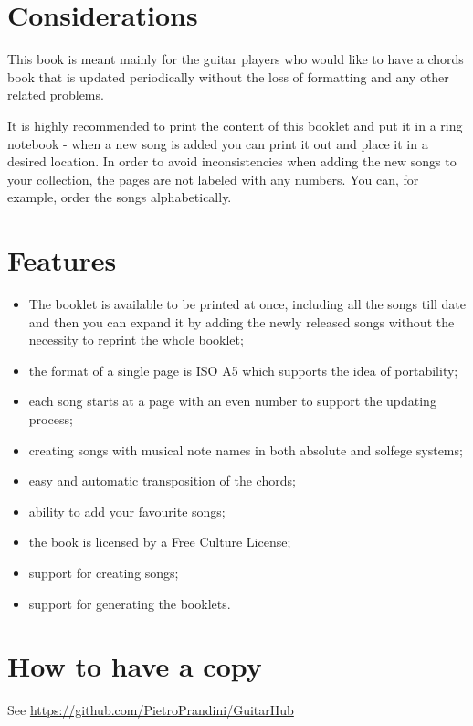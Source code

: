 % 
% 
% 
% 

\section*{Considerations}
This book is meant mainly for the guitar players who would like to have a chords book that is updated periodically without the loss of formatting and any other related problems.\par
It is highly recommended to print the content of this booklet and put it in a ring notebook - when a new song is added you can print it out and place it in a desired location. In order to avoid inconsistencies when adding the new songs to your collection, the pages are not labeled with any numbers. You can, for example, order the songs alphabetically.\par

\section*{Features}
\begin{itemize}
\item The booklet is available to be printed at once, including all the songs till date and then you can expand it by adding the newly released songs without the necessity to reprint the whole booklet;
\item the format of a single page is ISO A5 which supports the idea of  portability;
\item each song starts at a page with an even number to support the updating process;
\item creating songs with musical note names in both absolute and solfege systems;
\item easy and automatic transposition of the chords;
\item ability to add your favourite songs;
\item the book is licensed by a Free Culture License;
\item support for creating songs;
\item support for generating the booklets.
\end{itemize}

\section*{How to have a copy}
See \href{https://github.com/PietroPrandini/GuitarHub}{https://github.com/PietroPrandini/GuitarHub}

\begin{center}
\end{center}
